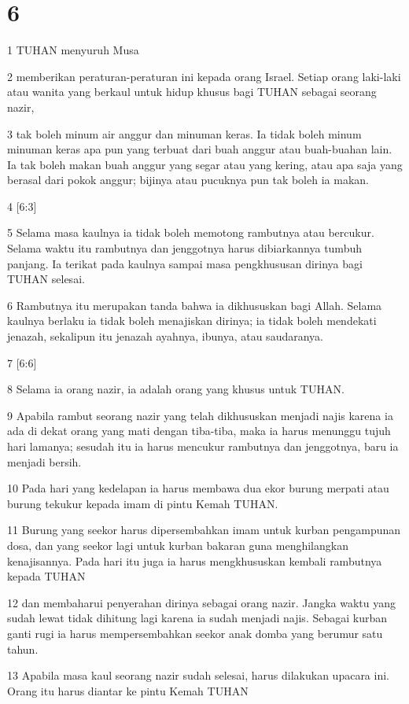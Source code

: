 \chapter{6}

\par 1 TUHAN menyuruh Musa
\par 2 memberikan peraturan-peraturan ini kepada orang Israel. Setiap orang laki-laki atau wanita yang berkaul untuk hidup khusus bagi TUHAN sebagai seorang nazir,
\par 3 tak boleh minum air anggur dan minuman keras. Ia tidak boleh minum minuman keras apa pun yang terbuat dari buah anggur atau buah-buahan lain. Ia tak boleh makan buah anggur yang segar atau yang kering, atau apa saja yang berasal dari pokok anggur; bijinya atau pucuknya pun tak boleh ia makan.
\par 4 [6:3]
\par 5 Selama masa kaulnya ia tidak boleh memotong rambutnya atau bercukur. Selama waktu itu rambutnya dan jenggotnya harus dibiarkannya tumbuh panjang. Ia terikat pada kaulnya sampai masa pengkhususan dirinya bagi TUHAN selesai.
\par 6 Rambutnya itu merupakan tanda bahwa ia dikhususkan bagi Allah. Selama kaulnya berlaku ia tidak boleh menajiskan dirinya; ia tidak boleh mendekati jenazah, sekalipun itu jenazah ayahnya, ibunya, atau saudaranya.
\par 7 [6:6]
\par 8 Selama ia orang nazir, ia adalah orang yang khusus untuk TUHAN.
\par 9 Apabila rambut seorang nazir yang telah dikhususkan menjadi najis karena ia ada di dekat orang yang mati dengan tiba-tiba, maka ia harus menunggu tujuh hari lamanya; sesudah itu ia harus mencukur rambutnya dan jenggotnya, baru ia menjadi bersih.
\par 10 Pada hari yang kedelapan ia harus membawa dua ekor burung merpati atau burung tekukur kepada imam di pintu Kemah TUHAN.
\par 11 Burung yang seekor harus dipersembahkan imam untuk kurban pengampunan dosa, dan yang seekor lagi untuk kurban bakaran guna menghilangkan kenajisannya. Pada hari itu juga ia harus mengkhususkan kembali rambutnya kepada TUHAN
\par 12 dan membaharui penyerahan dirinya sebagai orang nazir. Jangka waktu yang sudah lewat tidak dihitung lagi karena ia sudah menjadi najis. Sebagai kurban ganti rugi ia harus mempersembahkan seekor anak domba yang berumur satu tahun.
\par 13 Apabila masa kaul seorang nazir sudah selesai, harus dilakukan upacara ini. Orang itu harus diantar ke pintu Kemah TUHAN
